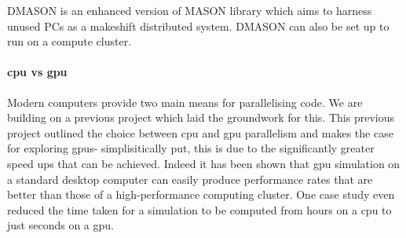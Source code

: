 \documentclass{UoYCSproject}
\begin{document}
DMASON is an enhanced version of \gls{MASON} library which aims to harness unused PCs as a makeshift distributed system.
DMASON can also be set up to run on a compute cluster.

\paragraph{\acrshort{cpu} vs \acrshort{gpu}}
\label{cpu_v_gpu}
Modern computers provide two main means for parallelising code.
We are building on a previous project\cite{phil_diss} which laid the groundwork for this.
This previous project outlined the choice between \acrshort{cpu} and \acrshort{gpu} parallelism and makes the case for exploring \acrshort{gpu}s- simplisitically put, this is due to the significantly greater speed ups that can be achieved.
Indeed it has been shown that \acrshort{gpu} simulation on a standard desktop computer can easily produce performance rates that are better than those of a high-performance computing cluster\cite{flame_simulation}.
One case study even reduced the time taken for a simulation to be computed from hours on a \acrshort{cpu} to just seconds on a \acrshort{gpu}\cite{flame_keratinocyte}.
\end{document}
